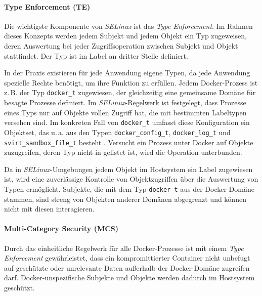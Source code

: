 \documentclass[../main.tex]{subfiles}
\begin{document}

				\paragraph{Type Enforcement (TE)}
					Die wichtigste Komponente von \emph{SELinux} ist das \emph{Type Enforcement}. Im Rahmen dieses Konzepts werden jedem Subjekt und jedem Objekt ein Typ zugeweisen, deren Auswertung bei jeder Zugriffsoperation zwischen Subjekt und Objekt stattfindet. Der Typ ist im Label an dritter Stelle definiert.

					In der Praxis existieren für jede Anwendung eigene Typen, da jede Anwendung spezielle Rechte benötigt, um ihre Funktion zu erfüllen. Jedem Docker-Prozess ist z.\,B. der Typ \texttt{docker\_t} zugewiesen, der gleichzeitig eine gemeinsame Domäne für besagte Prozesse definiert. Im \emph{SELinux}-Regelwerk ist festgelegt, dass Prozesse eines Typs nur auf Objekte vollen Zugriff hat, die mit bestimmten Labeltypen versehen sind. Im konkreten Fall von \texttt{docker\_t} umfasst diese Konfiguration ein Objektset, das u.\,a. aus den Typen \texttt{docker\_config\_t}, \texttt{docker\_log\_t} und \texttt{svirt\_sandbox\_file\_t} besteht \cite{githubSELinuxProfileTE}. Versucht ein Prozess unter Docker auf Objekte zuzugreifen, deren Typ nicht in \cite{githubSELinuxProfileTE} gelistet ist, wird die Operation unterbunden.

					Da in \emph{SELinux}-Umgebungen jedem Objekt im Hostsystem ein Label zugewiesen ist, wird eine zuverlässige Kontrolle von Objektzugriffen über die Auswertung von Typen ermöglicht. Subjekte, die mit dem Typ \texttt{docker\_t} aus der Docker-Domäne stammen, sind streng von Objekten anderer Domänen abgegrenzt und können nicht mit diesen interagieren.

				\paragraph{Multi-Category Security (MCS)}
					Durch das einheitliche Regelwerk für alle Docker-Prozesse ist mit einem \emph{Type Enforcement} gewährleistet, dass ein kompromittierter Container \cbroken{} nicht unbefugt auf geschützte oder unrelevante Daten außerhalb der Docker-Domäne  zugreifen darf. Docker-unspezifische Subjekte und Objekte werden dadurch im Hostsystem geschützt.
\end{document}
